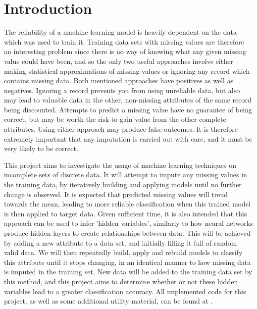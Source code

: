 \newpage
\chapter{Introduction}
The reliability of a machine learning model is heavily dependent on the data which was used to train it. Training data sets with missing values are therefore an interesting problem since there is no way of knowing what any given missing value could have been, and so the only two useful approaches involve either making statistical approximations of missing values or ignoring any record which contains missing data. Both mentioned approaches have positives as well as negatives. Ignoring a record prevents you from using unreliable data, but also may lead to valuable data in the other, non-missing attributes of the same record being discounted. Attempts to predict a missing value have no guarantee of being correct, but may be worth the risk to gain value from the other complete attributes. Using either approach may produce false outcomes. It is therefore extremely important that any imputation is carried out with care, and it must be very likely to be correct.

This project aims to investigate the usage of machine learning techniques on incomplete sets of discrete data. It will attempt to impute any missing values in the training data, by iteratively building and applying models until no further change is observed. It is expected that predicted missing values will trend towards the mean, leading to more reliable classification when this trained model is then applied to target data.  Given sufficient time, it is also intended that this approach can be used to infer 'hidden variables', similarly to how neural networks produce hidden layers to create relationships between data. This will be achieved by adding a new attribute to a data set, and initially filling it full of random valid data. We will then repeatedly build, apply and rebuild models to classify this attribute until it stops changing, in an identical manner to how missing data is imputed in the training set. New data will be added to the training data set by this method, and this project aims to determine whether or not these hidden variables lead to a greater classification accuracy. All implemented code for this project, as well as some additional utility material, can be found at \cite{gitlab}.
